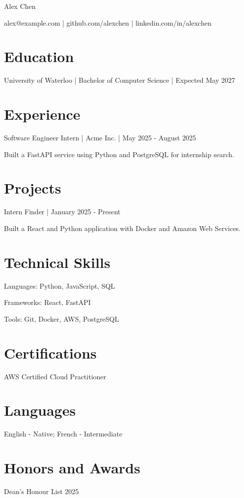 \documentclass{article}
\begin{document}
Alex Chen

alex@example.com | github.com/alexchen | linkedin.com/in/alexchen

\section{Education}
University of Waterloo | Bachelor of Computer Science | Expected May 2027

\section{Experience}
Software Engineer Intern | Acme Inc. | May 2025 - August 2025

Built a FastAPI service using Python and PostgreSQL for internship search.

\section{Projects}
Intern Finder | January 2025 - Present

Built a React and Python application with Docker and Amazon Web Services.

\section{Technical Skills}
Languages: Python, JavaScript, SQL

Frameworks: React, FastAPI

Tools: Git, Docker, AWS, PostgreSQL

\section{Certifications}
AWS Certified Cloud Practitioner

\section{Languages}
English - Native; French - Intermediate

\section{Honors and Awards}
Dean's Honour List 2025
\end{document}
